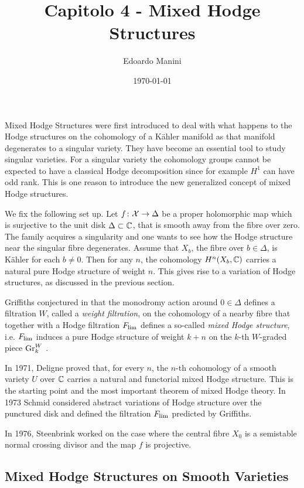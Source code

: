 \documentclass[../main.tex]{subfiles}
\title{Capitolo 4 - Mixed Hodge Structures}
\author{Edoardo Manini}
\date{\today}
\begin{document}
\ifSubfilesClassLoaded{
\maketitle
\tableofcontents
}{}


Mixed Hodge Structures were first introduced to deal with what happens to the Hodge structures on the cohomology of a K\"{a}hler manifold as that manifold degenerates to a singular variety. 
They have become an essential tool to study singular varieties.
For a singular variety the cohomology groups cannot be expected to have a classical Hodge decomposition since for example $H^1$ can have odd rank.
This is one reason to introduce the new generalized concept of mixed Hodge structures. 

We fix the following set up. Let $f\colon \mathcal{X}\to\Delta$ be a proper holomorphic map which is surjective to the unit disk $\Delta \subset \mathbb{C}$, that is smooth away from the fibre over zero. The family acquires a singularity and one wants to see how the Hodge structure near the singular fibre degenerates. Assume that $X_b$, the fibre over $b\in\Delta$, is K\"ahler for each $b\neq 0$. Then for any $n$, the cohomology $H^n(X_b,\mathbb{C})$ carries a natural pure Hodge structure of weight $n$. This gives rise to a variation of Hodge structures, as discussed in the previous section.

Griffiths conjectured in \cite{Gr70} that the monodromy action around $0 \in \Delta$ defines a filtration $W$, called a \emph{weight filtration}, on the cohomology of a nearby fibre that together with a Hodge filtration $F_{\operatorname{lim}}$ defines a so-called \emph{mixed Hodge structure}, i.e. $F_{\operatorname{lim}}$ induces a pure Hodge structure of weight $k+n$ on the $k$-th $W$-graded piece $\operatorname{Gr}_k^W$ .

In 1971, Deligne \cite{Del71} proved that, for every $n$, the $n$-th cohomology of a smooth variety $U$ over $\mathbb{C}$ carries a natural and functorial mixed Hodge structure.
This is the starting point and the most important theorem of mixed Hodge theory.
In 1973 Schmid \cite{Sc73} considered abstract variations of Hodge structure over the punctured disk and defined the filtration $F_{\operatorname{lim}}$ predicted by Griffiths.

In 1976, Steenbrink \cite{St75} worked on the case where the central fibre $X_0$ is a semistable normal crossing divisor and the map $f$ is projective. 

\subsection{Mixed Hodge Structures on Smooth Varieties}\label{mhssmooth}
\end{document}
